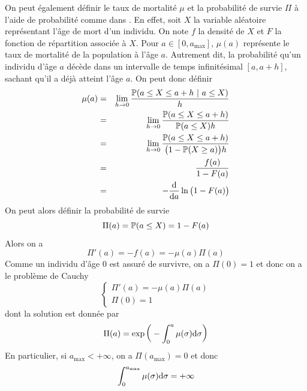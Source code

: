 \begin{remark}
    On peut également définir le taux de mortalité $\mu$ et la probabilité de survie $\Pi$ à l'aide de probabilité comme dans \cite[p.~3]{Inaba2017}. En effet, soit $X$ la variable aléatoire représentant l'âge de mort d'un individu. On note $f$ la densité de $X$ et $F$ la fonction de répartition associée à $X$. Pour $a \in [0,a_{\max}]$, $\mu(a)$ représente le taux de mortalité de la population à l'âge $a$. Autrement dit, la probabilité qu'un individu d'âge $a$ décède dans un intervalle de temps infinitésimal $[a,a+h]$, sachant qu'il a déjà atteint l'âge $a$. On peut donc définir
    \begin{eqnarray*}
        \mu(a) &=& \lim_{h \to 0} \frac{\bbP(a\leq X \leq a+h \ | \ a \leq X)}{h} \\
        &=& \lim_{h \to 0} \frac{\bbP(a \leq X \leq a+h)}{\bbP(a \leq X)h} \\
        &=& \lim_{h \to 0} \frac{\bbP(a \leq X \leq a+h)}{\big(1-\bbP(X \geq a)\big)h}\\
        &=& \frac{f(a)}{1-F(a)} \\
        &=& - \frac{\d}{\d a}\ln{\big(1-F(a)\big)}
    \end{eqnarray*}
    On peut alors définir la probabilité de survie
    \begin{equation*}
        \Pi(a) = \mathbb{P}(a \leq X) = 1 - F(a)
    \end{equation*}
    Alors on a 
    \begin{equation*}
        \Pi'(a) = -f(a) = -\mu(a)\Pi(a)
    \end{equation*}
    Comme un individu d'âge $0$ est assuré de survivre, on a $\Pi(0)=1$ et donc on a le problème de Cauchy
    \begin{equation*}
        \left\{\begin{array}{l}
            \Pi'(a) = -\mu(a)\Pi(a) \\
            \Pi(0)=1
        \end{array}\right.
    \end{equation*}
    dont la solution est donnée par 
    \begin{equation*}
        \Pi(a) = \exp\bigg(-\int_0^a \mu(\sigma)\mathrm{d} \sigma\bigg)
    \end{equation*}
    En particulier, si $a_{\max}<+\infty$, on a $\Pi(a_{\max})=0$ et donc 
    \begin{equation*}
        \int_0^{a_{\max}} \mu(\sigma)\mathrm{d} \sigma = +\infty
    \end{equation*}
\end{remark}

